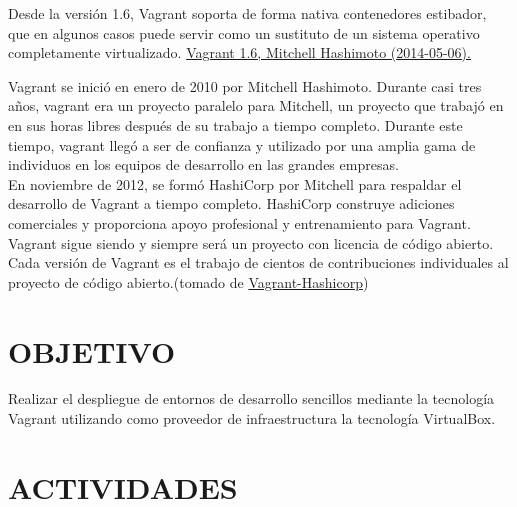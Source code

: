 \documentclass[10pt]{article}   			%
\begin{document}
Desde la versión 1.6, Vagrant soporta de forma nativa contenedores estibador, que en algunos casos puede servir como un sustituto de un sistema operativo completamente virtualizado. \href{https://www.hashicorp.com/blog/vagrant-1-6.html}{Vagrant 1.6, Mitchell Hashimoto (2014-05-06).}



Vagrant se inició en enero de 2010 por Mitchell Hashimoto. Durante casi tres años, vagrant era un proyecto paralelo para Mitchell, un proyecto que trabajó en en sus horas libres después de su trabajo a tiempo completo. Durante este tiempo, vagrant llegó a ser de confianza y utilizado por una amplia gama de individuos en los equipos de desarrollo en las grandes empresas.\\


En noviembre de 2012, se formó HashiCorp por Mitchell para respaldar el desarrollo de Vagrant a tiempo completo. HashiCorp construye adiciones comerciales y proporciona apoyo profesional y entrenamiento para Vagrant.\\


Vagrant sigue siendo y siempre será un proyecto con licencia de código abierto. Cada versión de Vagrant es el trabajo de cientos de contribuciones individuales al proyecto de código abierto.(tomado de \href{https://www.vagrantup.com/about.html}{Vagrant-Hashicorp})
	
\section{OBJETIVO}
Realizar el despliegue de entornos de desarrollo sencillos mediante la tecnología Vagrant utilizando como proveedor de infraestructura la tecnología VirtualBox.
\newpage
\section{ACTIVIDADES}	
\end{document}
